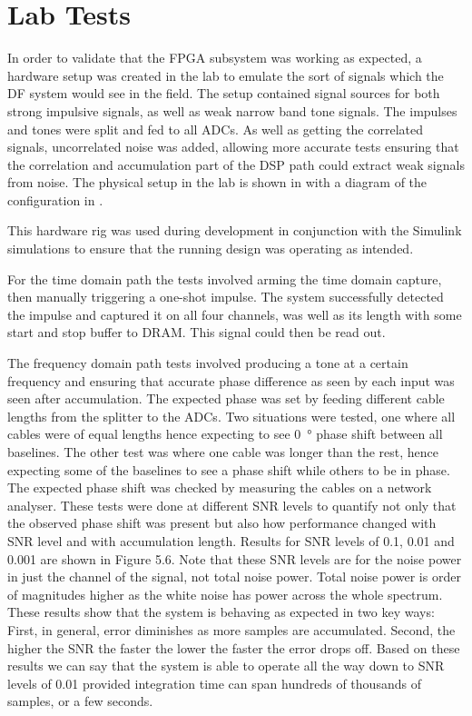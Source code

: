 \section{Lab Tests}
In order to validate that the FPGA subsystem was working as expected, a hardware setup was created in the lab to emulate the sort of signals which the DF system would see in the field. The setup contained signal sources for both strong impulsive signals, as well as weak narrow band tone signals. The impulses and tones were split and fed to all ADCs. As well as getting the correlated signals, uncorrelated noise was added, allowing more accurate tests ensuring that the correlation and accumulation part of the DSP path could extract weak signals from noise. The physical setup in the lab is shown in  with a diagram of the configuration in . 

This hardware rig was used during development in conjunction with the Simulink simulations to ensure that the running design was operating as intended. 

For the time domain path the tests involved arming the time domain capture, then manually triggering a one-shot impulse. The system successfully detected the impulse and captured it on all four channels, was well as its length with some start and stop buffer to DRAM. This signal could then be read out.

The frequency domain path tests involved producing a tone at a certain frequency and ensuring that accurate phase difference as seen by each input was seen after accumulation. The expected phase was set by feeding different cable lengths from the splitter to the ADCs. Two situations were tested, one where all cables were of equal lengths hence expecting to see \SI{0}{\degree} phase shift between all baselines. The other test was where one cable was longer than the rest, hence expecting some of the baselines to see a phase shift while others to be in phase. The expected phase shift was checked by measuring the cables on a network analyser. These tests were done at different SNR levels to quantify not only that the observed phase shift was present but also how performance changed with SNR level and with accumulation length. Results for SNR levels of 0.1, 0.01 and 0.001 are shown in Figure 5.6. Note that these SNR levels are for the noise power in just the channel of the signal, not total noise power. Total noise power is order of magnitudes higher as the white noise has power across the whole spectrum. These results show that the system is behaving as expected in two key ways: First, in general, error diminishes as more samples are accumulated. Second, the higher the SNR the faster the lower the faster the error drops off. Based on these results we can say that the system is able to operate all the way down to SNR levels of 0.01 provided integration time can span hundreds of thousands of samples, or a few seconds.

